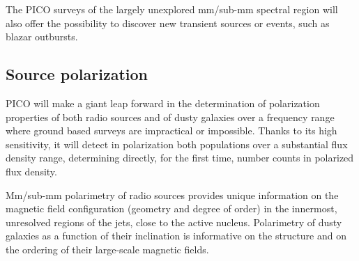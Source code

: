\documentclass[11pt,a4paper]{article}
\begin{document}
The PICO surveys of the largely unexplored mm/sub-mm spectral region will also
offer the possibility to discover new transient sources \cite{Metzger2015} or
events, such as blazar outbursts.


\subsection{Source polarization}

PICO will make a giant leap forward in the determination of polarization
properties of both radio sources and of dusty galaxies over a frequency range
where ground based surveys are impractical or impossible. Thanks to its high
sensitivity, it will detect in polarization both populations  over a
substantial flux density range, determining directly, for the first time,
number counts in polarized flux density.

Mm/sub-mm polarimetry of radio sources provides unique information on the
magnetic  field configuration (geometry and degree of order) in the innermost,
unresolved regions of the jets, close to the active nucleus. Polarimetry of
dusty galaxies as a function of their inclination is informative on the
structure and on the ordering of their large-scale magnetic fields.



\newpage




\end{document}
